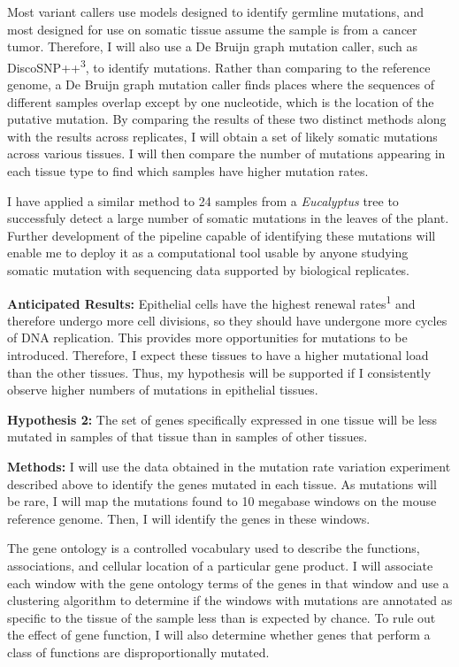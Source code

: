 \documentclass[12pt]{article}
\begin{document}
Most variant callers use models designed to identify germline mutations, and most designed for use on somatic tissue assume the sample is from a cancer tumor.
Therefore, I will also use a De Bruijn graph mutation caller, such as DiscoSNP++\textsuperscript{3}, to identify mutations.
Rather than comparing to the reference genome, a De Bruijn graph mutation caller finds places where the sequences of different samples overlap except by one nucleotide, which is the location of the putative mutation.
By comparing the results of these two distinct methods along with the results across replicates, I will obtain a set of likely somatic mutations across various tissues.
I will then compare the number of mutations appearing in each tissue type to find which samples have higher mutation rates.

I have applied a similar method to 24 samples from a \textit{Eucalyptus} tree to successfuly detect a large number of somatic mutations in the leaves of the plant. Further development of the pipeline capable of identifying these mutations will enable me to deploy it as a computational tool usable by anyone studying somatic mutation with sequencing data supported by biological replicates.

\textbf{Anticipated Results:}
Epithelial cells have the highest renewal rates\textsuperscript{1} and therefore undergo more cell divisions, so they should have undergone more cycles of DNA replication.
This provides more opportunities for mutations to be introduced.
Therefore, I expect these tissues to have a higher mutational load than the other tissues.
Thus, my hypothesis will be supported if I consistently observe higher numbers of mutations in epithelial tissues.

\textbf{Hypothesis 2:}
The set of genes specifically expressed in one tissue will be less mutated in samples of that tissue than in samples of other tissues.

\textbf{Methods:}
I will use the data obtained in the mutation rate variation experiment described above to identify the genes mutated in each tissue.
As mutations will be rare, I will map the mutations found to 10 megabase windows on the mouse reference genome.
Then, I will identify the genes in these windows.

The gene ontology is a controlled vocabulary used to describe the functions, associations, and cellular location of a particular gene product.
I will associate each window with the gene ontology terms of the genes in that window and use a clustering algorithm to determine if the windows with mutations are annotated as specific to the tissue of the sample less than is expected by chance.
To rule out the effect of gene function, I will also determine whether genes that perform a class of functions are disproportionally mutated.
\end{document}
